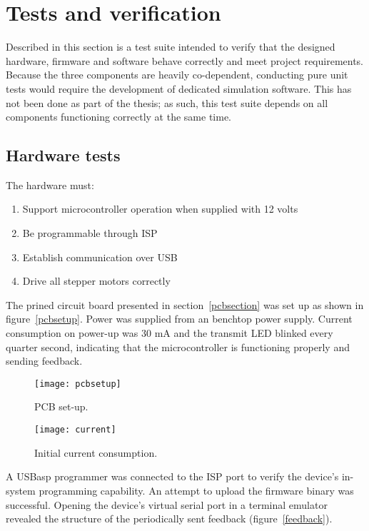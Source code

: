 \clearpage
\section{Tests and verification}

Described in this section is a test suite intended to verify that the designed
hardware, firmware and software behave correctly and meet project requirements.
Because the three components are heavily co-dependent, conducting pure unit
tests would require the development of dedicated simulation software. This has
not been done as part of the thesis; as such, this test suite depends on all
components functioning correctly at the same time.

\subsection{Hardware tests}

The hardware must:
\begin{enumerate}
    \item Support microcontroller operation when supplied with 12 volts
    \item Be programmable through ISP
    \item Establish communication over USB
    \item Drive all stepper motors correctly
\end{enumerate}

The prined circuit board presented in section~\ref{pcbsection} was set up as
shown in figure~\ref{pcbsetup}. Power was supplied from an benchtop power
supply. Current consumption on power-up was 30 mA and the transmit LED blinked
every quarter second, indicating that the microcontroller is functioning
properly and sending feedback.

\begin{figure}[ht]
    \centering
    \begin{minipage}{0.5\textwidth}
        \centering
        \texttt{[image: pcbsetup]}
        \caption{PCB set-up.}
        \label{pcbsetup}
    \end{minipage}\hfill
    \begin{minipage}{0.5\textwidth}
        \centering
        \texttt{[image: current]}
        \caption{Initial current consumption.}
        \label{current}
    \end{minipage}
\end{figure}

A USBasp programmer was connected to the ISP port to verify the device's
in-system programming capability. An attempt to upload the firmware binary was
successful. Opening the device's virtual serial port in a terminal emulator
revealed the structure of the periodically sent feedback
(figure~\ref{feedback}).

